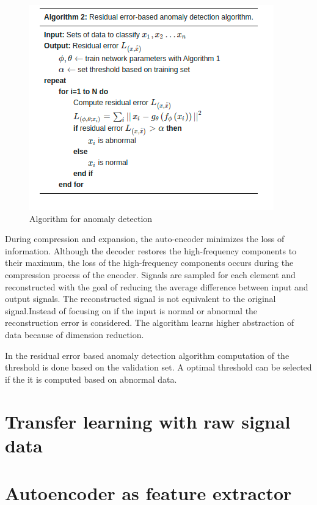    
   
    \begin{figure}[h]
    	\centering
    	\includegraphics[width=0.75\linewidth]{images/rsd.png}
    	\caption{Algorithm for anomaly detection \cite{oh2018residual} }
    	\label{n00}
    \end{figure}
    
    During compression and expansion, the auto-encoder minimizes the loss of information. Although the decoder restores the high-frequency components to their maximum, the loss of the high-frequency components occurs during the compression process of the encoder. Signals are sampled for each element and reconstructed with the goal of reducing the average difference between input and output signals. The reconstructed signal is not equivalent to the original signal.Instead of focusing on if the input is normal or abnormal the reconstruction error is considered. The algorithm learns higher abstraction of data because of dimension reduction.
    
    In the residual error based anomaly detection algorithm computation of the threshold is done based on the validation set. A optimal threshold can be selected if the it is computed based on abnormal data.
    
  
   \section{Transfer learning with raw signal data}
   

   
   
   \section{Autoencoder as feature extractor}    
   
